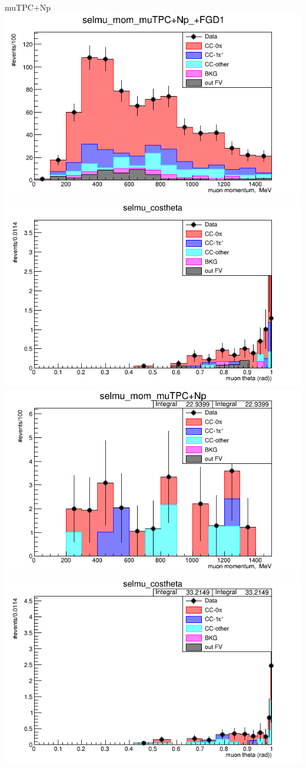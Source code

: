 \documentclass{beamer}
\begin{document}
\begin{frame}{muTPC+Np}
\center
\includegraphics[width=.45\textwidth]{images/selmu_mom_topology_muTPC+Np_accum_level[][0][97]_data_mc.png}
\includegraphics[width=.45\textwidth]{images/selmu_costheta_topology_muTPC+Np_accum_level[][0][97]_data_mc.png}
\includegraphics[width=.45\textwidth]{images/selmu_mom_fgd2topology_muTPC+Np_accum_level[][1][97]_data_mc.png}
\includegraphics[width=.45\textwidth]{images/selmu_costheta_fgd2topology_muTPC+Np_accum_level[][1][97]_data_mc.png}
\end{frame}
\end{document}
